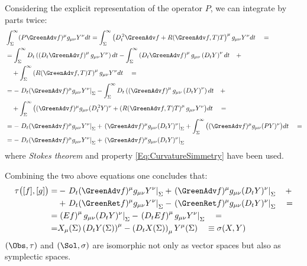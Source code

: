 \documentclass[Main]{subfiles}
\begin{document}
		Considering the explicit representation of the operator $P$, we can integrate by parts twice:
		\begin{align}
			&\int_\Sigma^\infty (P \GreenAdv f)^\mu g_{\mu \nu} Y^\nu dt = \int_\Sigma^\infty \left( D_t^{\,2} \GreenAdv f +R(\GreenAdv f,T)T \right)^\mu g_{\mu \nu} Y^\nu dt \quad = \nonumber \\
			&= 
			 \int_\Sigma^\infty D_t \left( \left(D_t  \GreenAdv f \right)^\mu g_{\mu \nu} Y^\nu \right)dt -
			 \int_\Sigma^\infty \left( D_t  \GreenAdv f \right)^\mu g_{\mu \nu} \left( D_t Y \right)^\nu dt \quad + \nonumber \\
			 &\quad + \int_\Sigma^\infty \left( R( \GreenAdv f,T)T \right)^\mu g_{\mu \nu} Y^\nu dt \quad = \nonumber \\
			&= 
			 - \left. D_t( \GreenAdv f)^\mu g_{\mu \nu} Y^\nu \right\vert_\Sigma -
			 \int_\Sigma^\infty D_t \left( \left( \GreenAdv f \right)^\mu g_{\mu \nu} \left( D_t Y \right)^\nu \right)dt \quad + \nonumber \\
			 &\quad + \int_\Sigma^\infty \big(
			 (\GreenAdv f)^\mu g_{\mu \nu} (D_t^{\, 2}Y)^\nu + 
			 \left(R( \GreenAdv f,T)T \right)^\mu g_{\mu \nu} Y^\nu
			 \big) dt	\quad =	 \nonumber \\
			 &=
			 -   \left. D_t( \GreenAdv f)^\mu g_{\mu \nu} Y^\nu \right\vert_\Sigma
			 +  \left. ( \GreenAdv f)^\mu g_{\mu \nu} (D_t Y)^\nu \right\vert_\Sigma
			 + \int_\Sigma^\infty \big(
			 (\GreenAdv f)^\mu g_{\mu \nu} (P Y)^\nu 
			 \big) dt \quad =\nonumber \\
			 &= 
			 -   \left. D_t( \GreenAdv f)^\mu g_{\mu \nu} Y^\nu \right\vert_\Sigma
			 +  \left. ( \GreenAdv f)^\mu g_{\mu \nu} (D_t Y)^\nu \right\vert_\Sigma
		\end{align}
		where \emph{Stokes theorem} and property \ref{Eq:CurvatureSimmetry} have been used.

		Combining the two above equations one concludes that:
		\begin{align}
		\tau\big( [f], [g] \big) =& 
			 -   \left. D_t( \GreenAdv f)^\mu g_{\mu \nu} Y^\nu \right\vert_\Sigma
			 +  \left. ( \GreenAdv f)^\mu g_{\mu \nu} (D_t Y)^\nu \right\vert_\Sigma \quad +
		\nonumber \\
			&+ \left. D_t( \GreenRet f)^\mu g_{\mu \nu} Y^\nu \right\vert_\Sigma
			   -  \left. ( \GreenRet f)^\mu g_{\mu \nu} (D_t Y)^\nu \right\vert_\Sigma		
		 \quad =  \nonumber\\
		=&\left. \left( E f \right)^\mu g_{\mu \nu} ( D_t Y)^\nu\right\vert_\Sigma	 
		-  \left.\left(D_t E f \right)^\mu g_{\mu \nu}  Y^\nu \right\vert_\Sigma	\quad = \nonumber \\
		=& X_\mu(\Sigma) \left( D_t Y (\Sigma)\right)^\mu - \left(D_t X(\Sigma)\right)_\mu Y^\mu(\Sigma) \quad \equiv \sigma( X, Y)
		\end{align}
		$(\Obs, \tau)$ and $(\Sol, \sigma)$ are isomorphic not only as vector spaces but also as symplectic spaces.
\end{document}
